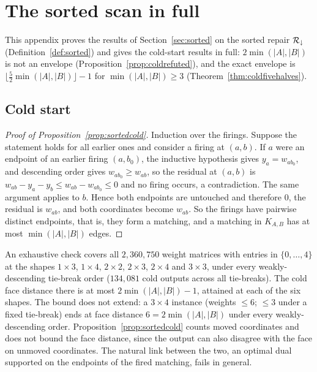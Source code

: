 \section{The sorted scan in full}\label{app:sorted}

This appendix proves the results of Section~\ref{sec:sorted} on the sorted repair
$\mathcal{R}_\downarrow$ (Definition~\ref{def:sorted}) and gives the cold-start results in full:
$2\min(|A|,|B|)$ is not an envelope (Proposition~\ref{prop:coldrefuted}), and the exact envelope is
$\lfloor\tfrac52\min(|A|,|B|)\rfloor - 1$ for $\min(|A|,|B|) \ge 3$
(Theorem~\ref{thm:coldfivehalves}).

\subsection{Cold start}

\begin{proof}[Proof of Proposition~\ref{prop:sortedcold}]
Induction over the firings. Suppose the statement holds for all earlier ones and consider a firing at
$(a,b)$. If $a$ were an endpoint of an earlier firing $(a,b_0)$, the inductive hypothesis gives
$y_a = w_{ab_0}$, and descending order gives $w_{ab_0} \ge w_{ab}$, so the residual at $(a,b)$ is
$w_{ab} - y_a - y_b \le w_{ab} - w_{ab_0} \le 0$ and no firing occurs, a contradiction. The same
argument applies to $b$. Hence both endpoints are untouched and therefore $0$, the residual is
$w_{ab}$, and both coordinates become $w_{ab}$. So the firings have pairwise distinct endpoints,
that is, they form a matching, and a matching in $K_{A,B}$ has at most $\min(|A|,|B|)$ edges.
\end{proof}

An exhaustive check covers all $2{,}360{,}750$ weight matrices with entries in $\{0,\dots,4\}$ at the
shapes $1{\times}3$, $1{\times}4$, $2{\times}2$, $2{\times}3$, $2{\times}4$ and $3{\times}3$, under
every weakly-descending tie-break order ($134{,}081$ cold outputs across all tie-breaks). The cold
face distance there is at most $2\min(|A|,|B|) - 1$, attained at each of the six shapes. The bound
does not extend: a $3\times4$ instance (weights $\le 6$; $\le 3$ under a fixed tie-break) ends at
face distance $6 = 2\min(|A|,|B|)$ under every weakly-descending order.
Proposition~\ref{prop:sortedcold} counts moved coordinates and does not bound the face distance,
since the output can also disagree with the face on unmoved coordinates. The natural link between
the two, an optimal dual supported on the endpoints of the fired matching, fails in general.

